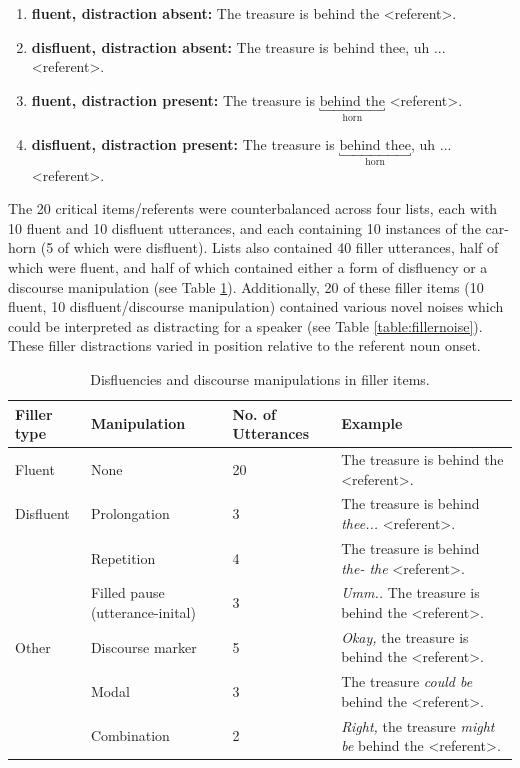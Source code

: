 \documentclass[a4paper,man,natbib]{apa6}
\begin{document}
\begin{enumerate}
\item \textbf{fluent, distraction absent:} The treasure is behind the \textless referent\textgreater .
\item \textbf{disfluent, distraction absent:} The treasure is behind thee, uh ... \textless referent\textgreater .
\item \textbf{fluent, distraction present:} The treasure is $\underbracket{\text{behind the}}_\text{horn}$ \textless referent\textgreater .
\item \textbf{disfluent, distraction present:} The treasure is $\underbracket{\text{behind thee}}_\text{horn}$, uh ...\textless referent\textgreater .
\end{enumerate}


The 20 critical items/referents were counterbalanced across four lists, each with 10 fluent and 10 disfluent utterances, and each containing 10 instances of the car-horn (5 of which were disfluent). 
Lists also contained 40 filler utterances, half of which were fluent, and half of which contained either a form of disfluency or a discourse manipulation (see Table \ref{table:fillers}). 
Additionally, 20 of these filler items (10 fluent, 10 disfluent/discourse manipulation) contained various novel noises which could be interpreted as distracting for a speaker (see Table \ref{table:fillernoise}). 
These filler distractions varied in position relative to the referent noun onset.

\begin{table}
\begin{tabularx}{\linewidth}{|X|X|X|X|}
  \hline
Filler type & Manipulation & No. of Utterances & Example \\
  \hline
Fluent & None & 20 & The treasure is behind the \textless referent\textgreater . \\
Disfluent & Prolongation & 3 & The treasure is behind \textit{thee...} \textless referent\textgreater . \\
& Repetition & 4 & The treasure is behind \textit{the- the} \textless referent\textgreater .\\
& Filled pause (utterance-inital) & 3 & \textit{Umm..} The treasure is behind the \textless referent\textgreater .\\
Other & Discourse marker & 5 & \textit{Okay,} the treasure is behind the \textless referent\textgreater .\\
& Modal & 3 & The treasure \textit{could be} behind the \textless referent\textgreater .\\ 
& Combination & 2 & \textit{Right,} the treasure \textit{might be} behind the \textless referent\textgreater .\\
   \hline
\end{tabularx}
\caption{Disfluencies and discourse manipulations in filler items.}
\label{table:fillers}
\end{table}
\end{document}
